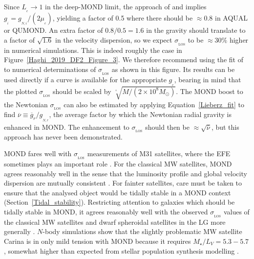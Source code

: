 \documentclass[fleqn,usenatbib,useAMS]{mnras} %
\begin{document}
Since $L_{_e} \to 1$ in the deep-MOND limit, the approach of \citet{Famaey_McGaugh_2012} and \citet{Famaey_2018} implies $g_{_i} = g_{_{N,i}}/\left( 2 \mu_{_e} \right)$, yielding a factor of 0.5 where there should be $\approx 0.8$ in AQUAL or QUMOND. An extra factor of $0.8/0.5 = 1.6$ in the gravity should translate to a factor of $\sqrt{1.6}$ in the velocity dispersion, so we expect $\sigma_{_\text{LOS}}$ to be $\approx 30\%$ higher in numerical simulations. This is indeed roughly the case in Figure~\ref{Haghi_2019_DF2_Figure_3}. We therefore recommend using the fit of \citet{Haghi_2019_DF2} to numerical determinations of $\sigma_{_\text{LOS}}$ as shown in this figure. Its results can be used directly if a curve is available for the appropriate $g_{_e}$, bearing in mind that the plotted $\sigma_{_\text{LOS}}$ should be scaled by $\sqrt[^4]{M/\left( 2 \times 10^8 M_\odot \right)}$. The MOND boost to the Newtonian $\sigma_{_\text{LOS}}$ can also be estimated by applying Equation~\ref{Lieberz_fit} to find $\overline{\nu} \equiv \overline{g}_r/g_{_{N,r}}$, the average factor by which the Newtonian radial gravity is enhanced in MOND. The enhancement to $\sigma_{_\text{LOS}}$ should then be $\approx \sqrt{\overline{\nu}}$, but this approach has never been demonstrated.

MOND fares well with $\sigma_{_\text{LOS}}$ measurements of M31 satellites, where the EFE sometimes plays an important role \citep{McGaugh_2013a, McGaugh_2013b}. For the classical MW satellites, MOND agrees reasonably well in the sense that the luminosity profile and global velocity dispersion are mutually consistent \citep{Sanders_2021}. For fainter satellites, care must be taken to ensure that the analysed object would be tidally stable in a MOND context (Section~\ref{Tidal_stability}). Restricting attention to galaxies which should be tidally stable in MOND, it agrees reasonably well with the observed $\sigma_{_\text{LOS}}$ values of the classical MW satellites \citep{Angus_2008} and dwarf spheroidal satellites in the LG more generally \citep{McGaugh_Wolf_2010}. $N$-body simulations show that the slightly problematic MW satellite Carina is in only mild tension with MOND because it requires $M_{\star}/L_V = 5.3-5.7$, somewhat higher than expected from stellar population synthesis modelling \citep{Angus_2014}.
\end{document}
